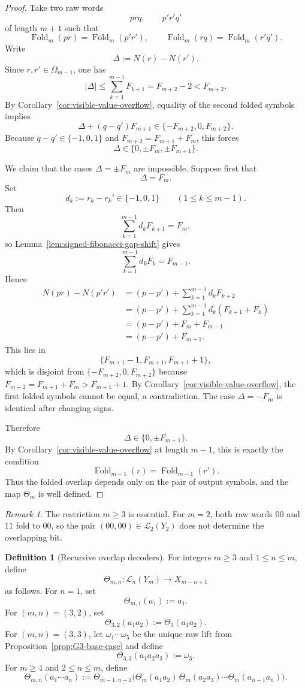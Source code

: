 \documentclass[11pt,letterpaper]{article}
\numberwithin{equation}{section}
\theoremstyle{plain}
\theoremstyle{definition}
\newtheorem{definition}[theorem]{Definition}
\theoremstyle{remark}
\newtheorem{remark}[theorem]{Remark}
\DeclareMathOperator{\Fold}{Fold}
\begin{document}
\begin{proof}
Take two raw words
\[
prq,\qquad p'r'q'
\]
of length $m+1$ such that
\[
\Fold_m(pr)=\Fold_m(p'r'),
\qquad
\Fold_m(rq)=\Fold_m(r'q').
\]
Write
\[
\Delta:=N(r)-N(r').
\]
Since $r,r'\in\Omega_{m-1}$, one has
\[
|\Delta|\le \sum_{k=1}^{m-1}F_{k+1}=F_{m+2}-2<F_{m+2}.
\]
By Corollary~\ref{cor:visible-value-overflow}, equality of the second folded
symbols implies
\[
\Delta+(q-q')F_{m+1}\in\{-F_{m+2},0,F_{m+2}\}.
\]
Because $q-q'\in\{-1,0,1\}$ and $F_{m+2}=F_{m+1}+F_m$, this forces
\[
\Delta\in\{0,\pm F_m,\pm F_{m+1}\}.
\]

We claim that the cases $\Delta=\pm F_m$ are impossible.  Suppose first that
\[
\Delta=F_m.
\]
Set
\[
d_k:=r_k-r_k'\in\{-1,0,1\}
\qquad (1\le k\le m-1).
\]
Then
\[
\sum_{k=1}^{m-1} d_kF_{k+1}=F_m,
\]
so Lemma~\ref{lem:signed-fibonacci-gap-shift} gives
\[
\sum_{k=1}^{m-1} d_kF_k=F_{m-1}.
\]
Hence
\[
\begin{aligned}
N(pr)-N(p'r')
&=
(p-p')+\sum_{k=1}^{m-1} d_kF_{k+2}\\
&=
(p-p')+\sum_{k=1}^{m-1} d_k(F_{k+1}+F_k)\\
&=
(p-p')+F_m+F_{m-1}\\
&=
(p-p')+F_{m+1}.
\end{aligned}
\]
This lies in
\[
\{F_{m+1}-1,F_{m+1},F_{m+1}+1\},
\]
which is disjoint from $\{-F_{m+2},0,F_{m+2}\}$ because
$F_{m+2}=F_{m+1}+F_m>F_{m+1}+1$.  By
Corollary~\ref{cor:visible-value-overflow}, the first folded symbols cannot be
equal, a contradiction.  The case $\Delta=-F_m$ is identical after changing
signs.

Therefore
\[
\Delta\in\{0,\pm F_{m+1}\}.
\]
By Corollary~\ref{cor:visible-value-overflow} at length $m-1$, this is exactly
the condition
\[
\Fold_{m-1}(r)=\Fold_{m-1}(r').
\]
Thus the folded overlap depends only on the pair of output symbols, and the map
$\Theta_m$ is well defined.
\end{proof}

\begin{remark}
The restriction $m\ge 3$ is essential.  For $m=2$, both raw words $00$ and
$11$ fold to $00$, so the pair $(00,00)\in\mathcal L_2(Y_2)$ does not
determine the overlapping bit.
\end{remark}

\begin{definition}[Recursive overlap decoders]
\label{def:recursive-overlap-decoder}
For integers $m\ge 3$ and $1\le n\le m$, define
\[
\Theta_{m,n}:\mathcal L_n(Y_m)\to X_{m-n+1}
\]
as follows.  For $n=1$, set
\[
\Theta_{m,1}(a_1):=a_1.
\]
For $(m,n)=(3,2)$, set
\[
\Theta_{3,2}(a_1a_2):=\Theta_3(a_1a_2).
\]
For $(m,n)=(3,3)$, let $\omega_1\cdots\omega_5$ be the unique raw lift from
Proposition~\ref{prop:G3-base-case} and define
\[
\Theta_{3,3}(a_1a_2a_3):=\omega_3.
\]
For $m\ge 4$ and $2\le n\le m$, define
\[
\Theta_{m,n}(a_1\cdots a_n)
:=
\Theta_{m-1,n-1}\bigl(
\Theta_m(a_1a_2)\,
\Theta_m(a_2a_3)\cdots
\Theta_m(a_{n-1}a_n)
\bigr).
\]
\end{definition}
\end{document}
